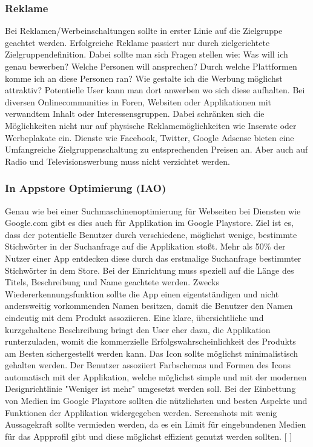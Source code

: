 \documentclass[FIPLY_base.tex]{subfiles}
\begin{document}
\subsubsection{Reklame}
Bei Reklamen/Werbeinschaltungen sollte in erster Linie auf die Zielgruppe geachtet werden. Erfolgreiche Reklame passiert nur durch zielgerichtete Zielgruppendefinition. Dabei sollte man sich Fragen stellen wie: Was will ich genau bewerben? Welche Personen will ansprechen? Durch welche Plattformen komme ich an diese Personen ran? Wie gestalte ich die Werbung möglichst attraktiv? \newline
Potentielle User kann man dort anwerben wo sich diese aufhalten. Bei diversen Onlinecommunities in Foren, Websiten oder Applikationen mit verwandtem Inhalt oder Interessensgruppen. Dabei schränken sich die Möglichkeiten nicht nur auf physische Reklamemöglichkeiten wie Inserate oder Werbeplakate ein. Dienste wie Facebook, Twitter, Google Adsense bieten eine Umfangreiche Zielgruppenschaltung zu entsprechenden Preisen an. Aber auch auf Radio und Televisionswerbung muss nicht verzichtet werden.


\subsubsection{In Appstore Optimierung (IAO)}
Genau wie bei einer Suchmaschinenoptimierung für Webseiten bei Diensten wie Google.com gibt es dies auch für Applikation im Google Playstore. Ziel ist es, dass der potentielle Benutzer durch verschiedene, möglichst wenige, bestimmte Stichwörter in der Suchanfrage auf die Applikation stoßt. Mehr als 50\% der Nutzer einer App entdecken diese durch das erstmalige Suchanfrage bestimmter Stichwörter in dem Store.
\newline
Bei der Einrichtung muss speziell auf die Länge des Titels, Beschreibung und Name geachtete werden. Zwecks Wiedererkennungsfunktion sollte die App einen eigentständigen und nicht andersweitig vorkommenden Namen besitzen, damit die Benutzer den Namen eindeutig mit dem Produkt assoziieren. Eine klare, übersichtliche und kurzgehaltene Beschreibung bringt den User eher dazu, die Applikation runterzuladen, womit die kommerzielle Erfolgswahrscheinlichkeit des Produkts am Besten sichergestellt werden kann. 
\newline
Das Icon sollte möglichst minimalistisch gehalten werden. Der Benutzer assoziiert Farbschemas und Formen des Icons automatisch mit der Applikation, welche möglichst simple und mit der modernen Designrichtlinie "Weniger ist mehr" umgesetzt werden soll. 
\newline
Bei der Einbettung von Medien im Google Playstore sollten die nützlichsten und besten Aspekte und Funktionen der Applikation widergegeben werden. Screenshots mit wenig Aussagekraft sollte vermieden werden, da es ein Limit für eingebundenen Medien für das Appprofil gibt und diese möglichst effizient genutzt werden sollten.
[ \cite{promteil2}]
\end{document}
